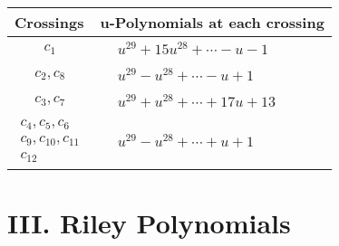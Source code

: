 \documentclass[1p]{elsarticle_modified}
\theoremstyle{definition}
\begin{document}
\begin{tabular}{m{50pt}|m{274pt}}
Crossings & \hspace{64pt}u-Polynomials at each crossing \\
\hline $$\begin{aligned}c_{1}\end{aligned}$$&$\begin{aligned}
&u^{29}+15 u^{28}+\cdots- u-1
\end{aligned}$\\
\hline $$\begin{aligned}c_{2},c_{8}\end{aligned}$$&$\begin{aligned}
&u^{29}- u^{28}+\cdots- u+1
\end{aligned}$\\
\hline $$\begin{aligned}c_{3},c_{7}\end{aligned}$$&$\begin{aligned}
&u^{29}+u^{28}+\cdots+17 u+13
\end{aligned}$\\
\hline $$\begin{aligned}c_{4},c_{5},c_{6}\\c_{9},c_{10},c_{11}\\c_{12}\end{aligned}$$&$\begin{aligned}
&u^{29}- u^{28}+\cdots+u+1
\end{aligned}$\\
\hline
\end{tabular}\newpage\renewcommand{\arraystretch}{1}
\centering \section*{ III. Riley Polynomials}
\end{document}
